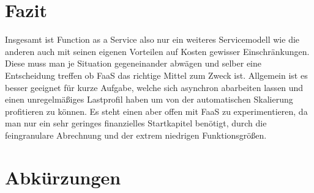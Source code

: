 \documentclass[12pt, a4paper]{article}
\begin{document}
\section{Fazit}
Insgesamt ist Function as a Service also nur ein weiteres Servicemodell wie die anderen auch mit seinen eigenen Vorteilen auf Kosten gewisser Einschränkungen.
Diese muss man je Situation gegeneinander abwägen und selber eine Entscheidung treffen ob \ac{FaaS} das richtige Mittel zum Zweck ist.
Allgemein ist es besser geeignet für kurze Aufgabe, welche sich asynchron abarbeiten lassen und einen unregelmäßiges Lastprofil haben um von der automatischen Skalierung profitieren zu können.
Es steht einen aber offen mit \ac{FaaS} zu experimentieren, da man nur ein sehr geringes finanzielles Startkapitel benötigt, durch die feingranulare Abrechnung und der extrem niedrigen Funktionsgrößen.

\newpage

\section{Abkürzungen}
\begin{acronym}
\end{acronym}
\newpage



\end{document}
